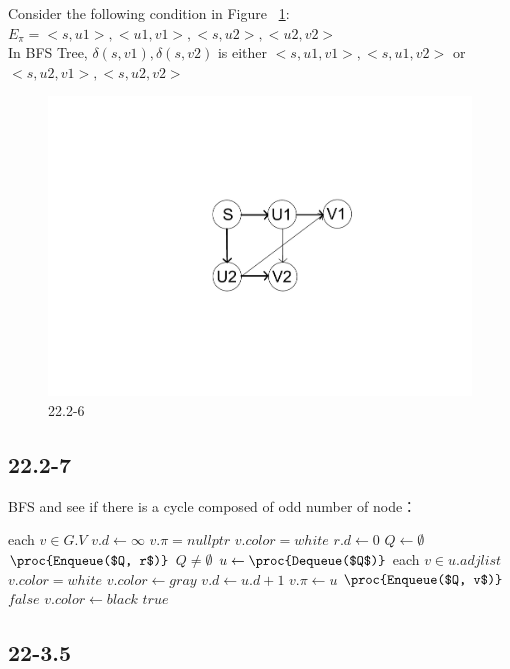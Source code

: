 \documentclass[]{article}
\begin{document}
Consider the following condition in Figure ~\ref{fig:22.2-6}: \\
$E_{\pi} = <s, u1>, <u1, v1>, <s, u2>, <u2, v2>$\\
In BFS Tree, $\delta (s, v1), \delta (s, v2) $ is either $<s, u1, v1>, <s, u1, v2>$ or $<s, u2, v1>, <s, u2, v2>$

\begin{figure}
	\centering
	\includegraphics[width=\linewidth]{2226}
	\caption{22.2-6}
	\label{fig:22.2-6}
\end{figure}

\subsection{22.2-7}
BFS and see if there is a cycle composed of odd number of node：

\begin{codebox}
	
	\li \For each $v \in G.V$
	\li \Do $v.d \leftarrow \infty$
	\li $v.\pi = nullptr$
	\li $v.color = white$ \End
	\li $r.d \leftarrow 0$
	\li $Q \leftarrow \emptyset$
	\li $\proc{Enqueue($Q, r$)}$
	\li \While $Q \neq \emptyset$
	\li \Do $u \leftarrow \proc{Dequeue($Q$)}$
	\li \For each $v \in u.adjlist$
	\li \Do \If $v.color = white$
	\li \Then $v.color \leftarrow gray$
	\li $v.d \leftarrow u.d + 1$
	\li $v.\pi \leftarrow u$
	\li  $\proc{Enqueue($Q, v$)}$ 
	\li \Else \Return $false$ \End \End
	\li $v.color \leftarrow black$ \End
	\li \Return $true$
\end{codebox}

\subsection{22-3.5}
\end{document}
